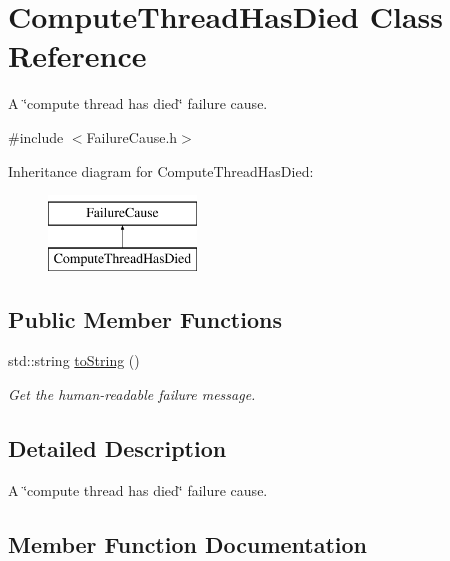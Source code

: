\hypertarget{class_compute_thread_has_died}{}\section{Compute\+Thread\+Has\+Died Class Reference}
\label{class_compute_thread_has_died}


A \char`\"{}compute thread has died\char`\"{} failure cause.  




{\ttfamily \#include $<$Failure\+Cause.\+h$>$}

Inheritance diagram for Compute\+Thread\+Has\+Died\+:\begin{figure}[H]
\begin{center}
\leavevmode
\includegraphics[height=2.000000cm]{class_compute_thread_has_died}
\end{center}
\end{figure}
\subsection*{Public Member Functions}
\begin{DoxyCompactItemize}
\item 
std\+::string \hyperlink{class_compute_thread_has_died_a92113465847a989dcfbc410fea710c31}{to\+String} ()
\begin{DoxyCompactList}\small\item\em Get the human-\/readable failure message. \end{DoxyCompactList}\end{DoxyCompactItemize}


\subsection{Detailed Description}
A \char`\"{}compute thread has died\char`\"{} failure cause. 

\subsection{Member Function Documentation}
\mbox{\label{class_compute_thread_has_died_a92113465847a989dcfbc410fea710c31}} 
